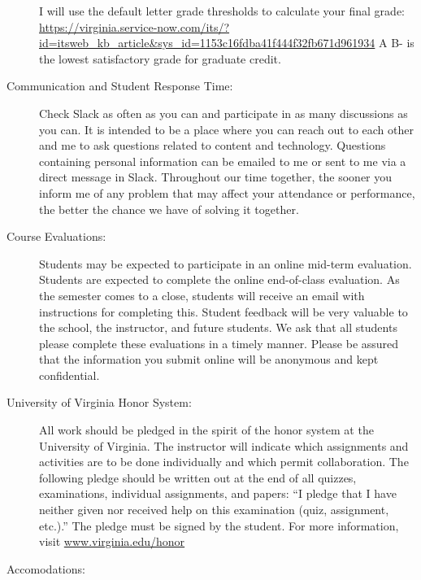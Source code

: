 \documentclass[11pt]{article}
\begin{document}
\begin{description}
I will use the default letter grade thresholds to calculate your final grade: \url{https://virginia.service-now.com/its/?id=itsweb_kb_article&sys_id=1153c16fdba41f444f32fb671d961934} A B- is the lowest satisfactory grade for graduate credit.



\item[Communication and Student Response Time:]  

Check Slack as often as you can and participate in as many discussions as you can. It is intended to be a place where you can reach out to each other and me to ask questions related to content and technology. Questions containing personal information can be emailed to me or sent to me via a direct message in Slack. Throughout our time together, the sooner you inform me of any problem that may affect your attendance or performance, the better the chance we have of solving it together.


\item[Course Evaluations:]  

Students may be expected to participate in an online mid-term evaluation. Students are expected to complete the online end-of-class evaluation. As the semester comes to a close, students will receive an email with instructions for completing this. Student feedback will be very valuable to the school, the instructor, and future students. We ask that all students please complete these evaluations in a timely manner. Please be assured that the information you submit online will be anonymous and kept confidential.

\item[University of Virginia Honor System:]  

All work should be pledged in the spirit of the honor system at the University of Virginia. The instructor will indicate which assignments and activities are to be done individually and which permit collaboration. The following pledge should be written out at the end of all quizzes, examinations, individual assignments, and papers: “I pledge that I have neither given nor received help on this examination (quiz, assignment, etc.).” The pledge must be signed by the student. For more information, visit \url{www.virginia.edu/honor}

\item[Accomodations:]  


\end{description}
\end{document}
